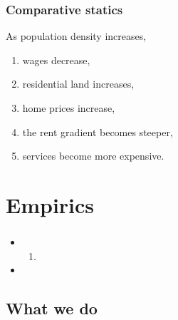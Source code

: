 \documentclass[handout,compress,mathserif]{beamer}
\newcounter{perc}
\newcounter{percek}
\begin{document}
\begin{frame}\frametitle{Comparative statics}
As population density increases,
\begin{enumerate}
    \item wages decrease,
    \item residential land increases,
    \item home prices increase,
    \item the rent gradient becomes steeper,
    \item services become more expensive.
\end{enumerate}
\end{frame}


\section{Empirics}

\begin{frame}\frametitle{}
    
\begin{itemize}[<+->]
    \item
    \begin{enumerate}[<+->]
        \item
    \end{enumerate}
    \item
\end{itemize}
\end{frame}




\addtocounter{percek}{9}

\subsection{What we do}
\end{document}
